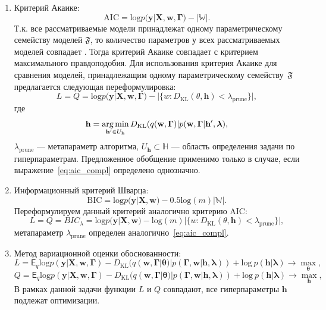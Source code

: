 \begin{enumerate}
\item Критерий Акаике:
\[
   \text{AIC} =  \text{log}p(\mathbf{y}|\mathbf{X}, \mathbf{w}, \boldsymbol{\Gamma})-|\mathbb{W}|.
\]
Т.к. все рассматриваемые модели принадлежат одному параметрическому семейству моделей $\mathfrak{F}$, то количество параметров у всех рассматриваемых моделей  совпадает . Тогда критерий Акаике совпадает с критерием максимального правдоподобия. Для использования критерия Акаике для сравнения моделей, принадлежащим одному параметрическому семейству~$\mathfrak{F}$ предлагается следующая переформулировка:
\begin{equation}
\label{eq:optim_aic}
    L = Q = \text{log}p(\mathbf{y}|\mathbf{X}, \mathbf{w}, \boldsymbol{\Gamma})
-|\{w: D_\text{KL}(\theta, \mathbf{h})<\lambda_{\text{prune}}\}|,
\end{equation}
где 
\begin{equation}\label{eq:aic_compl}\mathbf{h}=\operatorname*{arg\,min}_{\mathbf{h}'\in U_\mathbf{h}}D_\text{KL}(q(\mathbf{w},\boldsymbol{\Gamma})| p(\mathbf{w},\boldsymbol{\Gamma}|\mathbf{h}',\boldsymbol{\lambda}),\end{equation} $\lambda_{\text{prune}}$ --- метапараметр алгоритма, $U_\mathbf{h}  \subset \mathbb{H}$ --- область определения задачи по гиперпараметрам. Предложенное обобщение применимо только в случае, если выражение~\eqref{eq:aic_compl} определено однозначно.

\item Информационный критерий Шварца:
\[
    \text{BIC} = \text{log}p(\mathbf{y}|\mathbf{X}, \mathbf{w})-0.5\text{log}(m)|\mathbb{W}|.
\]
Переформулируем данный критерий аналогично критерию AIC:
\begin{equation}
\label{eq:optim_bic}
    L = Q = BIC_{\lambda} = \text{log}p(\mathbf{y}|\mathbf{X}, \mathbf{w}) - \text{log}(m)|\{w: D_\text{KL}(\theta, \mathbf{h})<\lambda_{\text{prune}}\}|,
\end{equation}
метапараметр $\lambda_{\text{prune}}$ определен аналогично~\eqref{eq:aic_compl}.

\item Метод вариационной оценки обоснованности:
\begin{equation}
\label{eq:optim_elbo_method}   
    L = \mathsf{E}_q \text{log}p(\mathbf{y}|\mathbf{X}, \mathbf{w}, \boldsymbol{\Gamma})-D_\text{KL}(q(\mathbf{w}, \boldsymbol{\Gamma}|\boldsymbol{\theta})|p(\boldsymbol{\Gamma}, \mathbf{w}|\mathbf{h},\boldsymbol{\lambda}))  + \text{log}~p(\mathbf{h}|\boldsymbol{\lambda}) \to \max_{\boldsymbol{\theta}},
\end{equation}
\[
    Q = \mathsf{E}_q \text{log}p(\mathbf{y}|\mathbf{X}, \mathbf{w}, \boldsymbol{\Gamma})-D_\text{KL}(q(\mathbf{w}, \boldsymbol{\Gamma}|\boldsymbol{\theta})|p(\boldsymbol{\Gamma}, \mathbf{w}|\mathbf{h},\boldsymbol{\lambda}))  + \text{log}~p(\mathbf{h}|\boldsymbol{\lambda}) \to \max_{\mathbf{h}},
\]
В рамках данной задачи функции $L$ и $Q$ совпадают, все гиперпараметры $\mathbf{h}$ подлежат оптимизации.


\end{enumerate}
